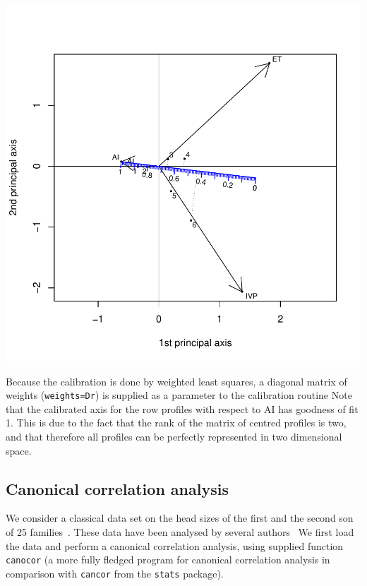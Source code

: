 \documentclass[a4paper]{article}
\begin{document}
\includegraphics{CalibrationGuide-014}

Because the calibration is done by weighted least squares, a diagonal matrix of weights ({\tt weights=Dr}) 
is supplied as a parameter to the calibration routine
Note that the calibrated axis for the row profiles with respect to AI has goodness of fit 1. This
is due to the fact that the rank of the matrix of centred profiles is two, and that therefore
all profiles can be perfectly represented in two dimensional space.

\subsection{Canonical correlation analysis}
\label{sec:cca}

We consider a classical data set on the head sizes of the first and the second son of 25 families~\cite{Frets}.
These data have been analysed by several authors~\cite{Anderson,Mardia,Graffel16}
We first load the data and perform
a canonical correlation analysis, using supplied function {\tt canocor} (a more fully 
fledged program for canonical correlation analysis in comparison with {\tt cancor} from the {\tt stats} package).
\end{document}
